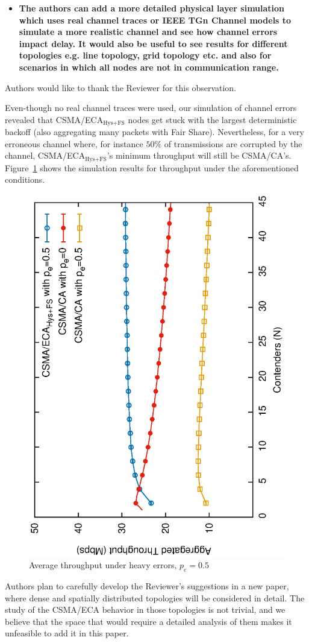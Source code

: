 \documentclass[]{article}
\begin{document}
	\begin{itemize}
		\item {\bfseries The authors can add a more detailed physical layer simulation which uses real channel traces or IEEE TGn Channel models to simulate a more realistic channel and see how channel errors impact delay. It would also be useful to see results for different topologies e.g. line topology, grid topology etc. and also for scenarios in which all nodes are not in communication range.}
	\end{itemize}

		Authors would like to thank the Reviewer for this observation.
	
		Even-though no real channel traces were used, our simulation of channel errors revealed that CSMA/ECA$_{\text{Hys+FS}}$ nodes get stuck with the largest deterministic backoff (also aggregating many packets with Fair Share). Nevertheless, for a very erroneous channel where, for instance $50\%$ of transmissions are corrupted by the channel, CSMA/ECA$_{\text{Hys+FS}}$'s minimum throughput will still be CSMA/CA's. Figure~\ref{fig:heavyErrors} shows the simulation results for throughput under the aforementioned conditions. 
		
		\begin{figure}[tb]
		\centering
			\includegraphics[width=0.45\linewidth,angle=-90]{figures/tonFigs/heavyErrors.eps}
			\caption{Average throughput under heavy errors, $p_e=0.5$}
			\label{fig:heavyErrors}
		\end{figure}
		
		Authors plan to carefully develop the Reviewer’s suggestions in a new paper, where dense and spatially distributed topologies will be considered in detail. The study of the CSMA/ECA behavior in those topologies is not trivial, and we believe that the space that would require a detailed analysis of them makes it unfeasible to add it in this paper.
		
\end{document}
